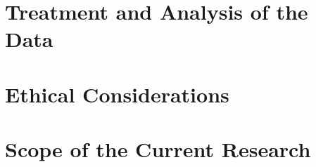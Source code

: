 
\section{Treatment and Analysis of the Data}
\label{sec:analysis}


\section{Ethical Considerations}
\label{sec:ethics}


\section{Scope of the Current Research}
\label{sec:methods_scope}

